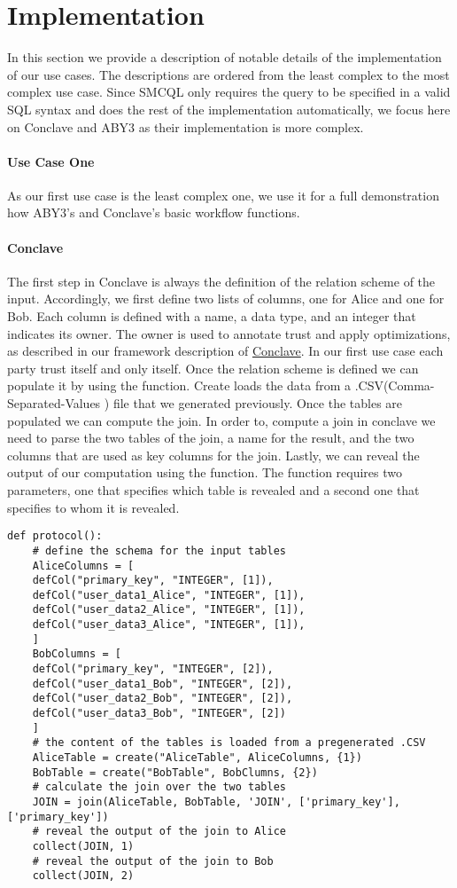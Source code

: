 \section{Implementation}
\label{Implemetation}	
In this section we provide a description of notable details of the implementation of our use cases. 
The descriptions are ordered from the least complex to the most complex use case. Since SMCQL only requires the query to be specified in a valid SQL syntax and does the rest of the implementation automatically, we focus here on Conclave and ABY3 as their implementation is more complex.    
\paragraph{Use Case One}
As our first use case is the least complex one, we use it for a full demonstration how ABY3's and Conclave's basic workflow functions. 
\paragraph{Conclave} 
The first step in Conclave is always the definition of the relation scheme of the input. Accordingly, we first define two lists of columns, one for Alice and one for Bob. Each column is defined with a name, a data type, and an integer that indicates its owner. The owner is used to annotate trust and apply optimizations, as described in our framework description of \hyperref[Trust_label]{Conclave}. In our first use case each party trust itself and only itself. Once the relation scheme is defined we can populate it by using the  function. Create loads the data from a .CSV(Comma-Separated-Values ) file that we generated previously. Once the tables are populated we can compute the join. In order to, compute a join in conclave we need to parse the two tables of the join, a name for the result, and the two columns that are used as key columns for the join. 
Lastly, we can reveal the output of our computation using the  function. The  function requires two parameters, one that specifies which table is revealed and a second one that specifies to whom it is revealed.
\begin{lstlisting}[caption={ The Python protocol of Conclave for our first use case    }]
def protocol():
	# define the schema for the input tables 
	AliceColumns = [
	defCol("primary_key", "INTEGER", [1]),
	defCol("user_data1_Alice", "INTEGER", [1]),
	defCol("user_data2_Alice", "INTEGER", [1]),
	defCol("user_data3_Alice", "INTEGER", [1]),
	]
	BobColumns = [
	defCol("primary_key", "INTEGER", [2]),
	defCol("user_data1_Bob", "INTEGER", [2]),
	defCol("user_data2_Bob", "INTEGER", [2]),
	defCol("user_data3_Bob", "INTEGER", [2])
	]
	# the content of the tables is loaded from a pregenerated .CSV
	AliceTable = create("AliceTable", AliceColumns, {1})
	BobTable = create("BobTable", BobClumns, {2})
	# calculate the join over the two tables 
	JOIN = join(AliceTable, BobTable, 'JOIN', ['primary_key'], ['primary_key'])
	# reveal the output of the join to Alice
	collect(JOIN, 1)
	# reveal the output of the join to Bob
	collect(JOIN, 2)
\end{lstlisting}

